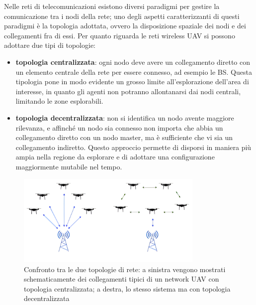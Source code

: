 Nelle reti di telecomunicazioni esistono diversi paradigmi per gestire la comunicazione tra i nodi della rete; uno degli aspetti caratterizzanti di questi paradigmi è la topologia adottata, ovvero la disposizione spaziale dei nodi e dei collegamenti fra di essi.
Per quanto riguarda le reti wireless UAV si possono adottare due tipi di topologie:
\begin{itemize}

\item \textbf{topologia centralizzata}:
ogni nodo deve avere un collegamento diretto con un elemento centrale della rete per essere connesso, ad esempio le BS. Questa tipologia pone in modo evidente un grosso limite all'esplorazione dell'area di interesse, in quanto gli agenti non potranno allontanarsi dai nodi centrali, limitando le zone esplorabili.

\item \textbf{topologia decentralizzata}:
non si identifica un nodo avente maggiore rilevanza, e affinché un nodo sia connesso non importa che abbia un collegamento diretto con un nodo master, ma è sufficiente che vi sia un collegamento indiretto. Questo approccio permette di disporsi in maniera più ampia nella regione da esplorare e di adottare una configurazione maggiormente mutabile nel tempo.
\end{itemize}
\begin{figure}
    \centering
    \includegraphics[width=0.8\textwidth]{img/ch1/uav_network_topology.png}
    \caption[Esempi di topologie di rete]{Confronto tra le due topologie di rete: a sinistra vengono mostrati schematicamente dei collegamenti tipici di un network UAV con topologia centralizzata; a destra, lo stesso sistema ma con topologia decentralizzata}
    \label{fig:uav_topology_example}
\end{figure}

